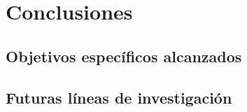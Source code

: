 \chapter{Conclusiones}

\section{Objetivos específicos alcanzados}

\section{Futuras líneas de investigación}